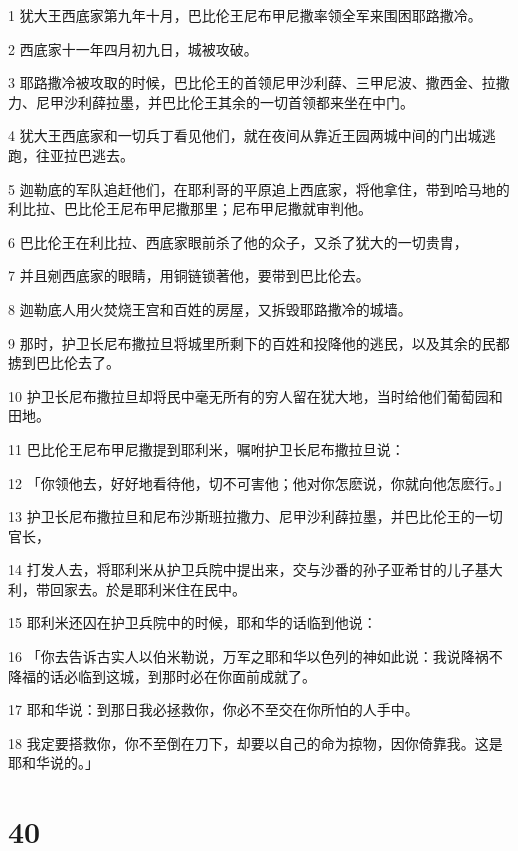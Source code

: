 \par 1 犹大王西底家第九年十月，巴比伦王尼布甲尼撒率领全军来围困耶路撒冷。
\par 2 西底家十一年四月初九日，城被攻破。
\par 3 耶路撒冷被攻取的时候，巴比伦王的首领尼甲沙利薛、三甲尼波、撒西金、拉撒力、尼甲沙利薛拉墨，并巴比伦王其余的一切首领都来坐在中门。
\par 4 犹大王西底家和一切兵丁看见他们，就在夜间从靠近王园两城中间的门出城逃跑，往亚拉巴逃去。
\par 5 迦勒底的军队追赶他们，在耶利哥的平原追上西底家，将他拿住，带到哈马地的利比拉、巴比伦王尼布甲尼撒那里；尼布甲尼撒就审判他。
\par 6 巴比伦王在利比拉、西底家眼前杀了他的众子，又杀了犹大的一切贵胄，
\par 7 并且剜西底家的眼睛，用铜链锁著他，要带到巴比伦去。
\par 8 迦勒底人用火焚烧王宫和百姓的房屋，又拆毁耶路撒冷的城墙。
\par 9 那时，护卫长尼布撒拉旦将城里所剩下的百姓和投降他的逃民，以及其余的民都掳到巴比伦去了。
\par 10 护卫长尼布撒拉旦却将民中毫无所有的穷人留在犹大地，当时给他们葡萄园和田地。
\par 11 巴比伦王尼布甲尼撒提到耶利米，嘱咐护卫长尼布撒拉旦说：
\par 12 「你领他去，好好地看待他，切不可害他；他对你怎麽说，你就向他怎麽行。」
\par 13 护卫长尼布撒拉旦和尼布沙斯班拉撒力、尼甲沙利薛拉墨，并巴比伦王的一切官长，
\par 14 打发人去，将耶利米从护卫兵院中提出来，交与沙番的孙子亚希甘的儿子基大利，带回家去。於是耶利米住在民中。
\par 15 耶利米还囚在护卫兵院中的时候，耶和华的话临到他说：
\par 16 「你去告诉古实人以伯米勒说，万军之耶和华以色列的神如此说：我说降祸不降福的话必临到这城，到那时必在你面前成就了。
\par 17 耶和华说：到那日我必拯救你，你必不至交在你所怕的人手中。
\par 18 我定要搭救你，你不至倒在刀下，却要以自己的命为掠物，因你倚靠我。这是耶和华说的。」

\chapter{40}

